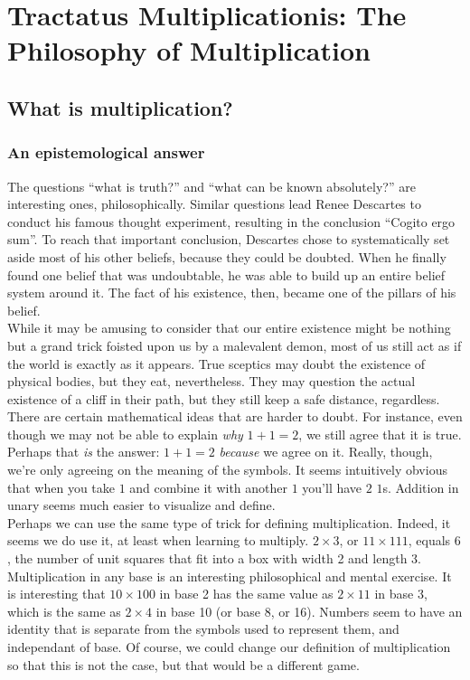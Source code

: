 \documentclass{article}
\begin{document}

\section{Tractatus Multiplicationis: The Philosophy of Multiplication}
\subsection{What is multiplication?}
\subsubsection{An epistemological answer}
The questions ``what is truth?'' and ``what can be known absolutely?'' are interesting ones, philosophically. Similar questions lead Renee Descartes to conduct his famous thought experiment, resulting in the conclusion ``Cogito ergo sum''. To reach that important conclusion, Descartes chose to systematically set aside most of his other beliefs, because they could be doubted. When he finally found one belief that was undoubtable, he was able to build up an entire belief system around it. The fact of his existence, then, became one of the pillars of his belief.\\
While it may be amusing to consider that our entire existence might be nothing but a grand trick foisted upon us by a malevalent demon, most of us still act as if the world is exactly as it appears. True sceptics may doubt the existence of physical bodies, but they eat, nevertheless. They may question the actual existence of a cliff in their path, but they still keep a safe distance, regardless.\\
There are certain mathematical ideas that are harder to doubt. For instance, even though we may not be able to explain \emph{why} $1 + 1 = 2$, we still agree that it is true. Perhaps that \emph{is} the answer: $1 + 1 = 2$ \emph{because} we agree on it. Really, though, we're only agreeing on the meaning of the symbols. It seems intuitively obvious that when you take $1$ and combine it with another $1$ you'll have $2$ $1$s. Addition in unary seems much easier to visualize and define.\\
Perhaps we can use the same type of trick for defining multiplication. Indeed, it seems we do use it, at least when learning to multiply. $2 \times 3$, or $11 \times 111$, equals $6$, the number of unit squares that fit into a box with width 2 and length 3.\\
Multiplication in any base is an interesting philosophical and mental exercise. It is interesting that $10 \times 100$ in base 2 has the same value as $2 \times 11$ in base 3, which is the same as $2 \times 4$ in base 10 (or base 8, or 16). Numbers seem to have an identity that is separate from the symbols used to represent them, and independant of base. Of course, we could change our definition of multiplication so that this is not the case, but that would be a different game.
\end{document}
